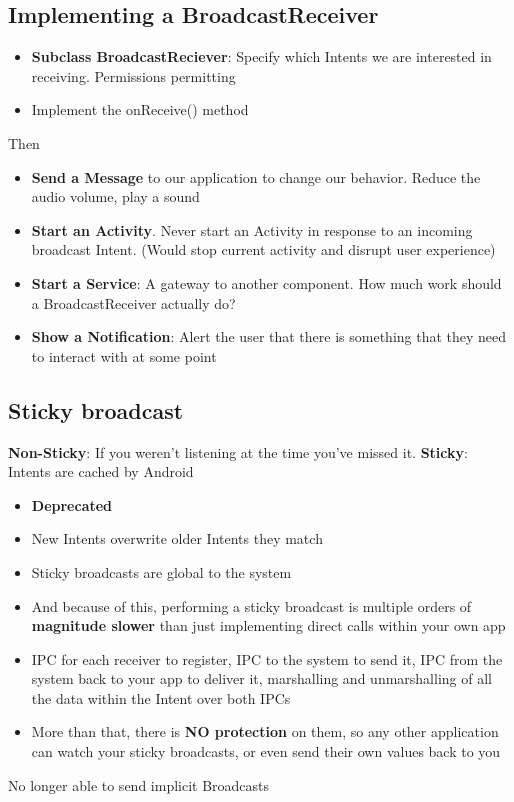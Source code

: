 \documentclass{article}
\begin{document}
\subsection{Implementing a BroadcastReceiver}

\begin{itemize}
  \item \textbf{Subclass BroadcastReciever}: Specify which Intents we are interested in receiving. Permissions permitting
  \item Implement the onReceive() method
\end{itemize}

\begin{flushleft}
Then
\begin{itemize}
  \item \textbf{Send a Message} to our application to change our behavior. Reduce the audio volume, play a sound 
  \item \textbf{Start an Activity}. Never start an Activity in response to an incoming broadcast Intent. (Would stop current activity and disrupt user experience) 
  \item \textbf{Start a Service}: A gateway to another component. How much work should a BroadcastReceiver actually do? 
  \item \textbf{Show a Notification}: Alert the user that there is something that they need to interact with at some point
\end{itemize}
\end{flushleft}

\subsection{Sticky broadcast}

\begin{flushleft}
\textbf{Non-Sticky}: If you weren’t listening at the time you’ve missed it.
\textbf{Sticky}: Intents are cached by Android
\begin{itemize}
  \item \textbf{Deprecated}
  \item New Intents overwrite older Intents they match 
  \item Sticky broadcasts are global to the system 
  \item And because of this, performing a sticky broadcast is multiple orders of \textbf{magnitude slower} than just implementing direct calls within your own app 
  \item IPC for each receiver to register, IPC to the system to send it, IPC from the system back to your app to deliver it, marshalling and unmarshalling of all the data within the Intent over both IPCs 
  \item More than that, there is \textbf{NO protection} on them, so any other application can watch your sticky broadcasts, or even send their own values back to you
\end{itemize}
No longer able to send implicit Broadcasts
\end{flushleft}
\end{document}
